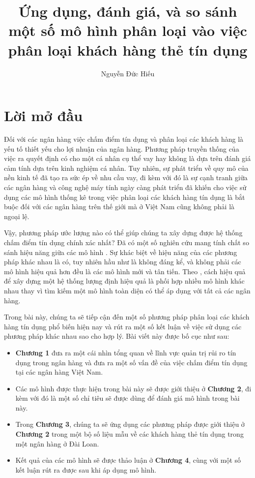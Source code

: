 \documentclass[a4paper]{report}\usepackage[]{graphicx}\usepackage[]{color}
\title{Ứng dụng, đánh giá, và so sánh một số mô hình phân loại vào việc phân loại khách hàng thẻ tín dụng}\let\Title\@title
\author{Nguyễn Đức Hiếu}\let\Author\@author
\begin{document}


\chapter*{Lời mở đầu}

%
Đối với các ngân hàng việc chấm điểm tín dụng và phân loại các khách hàng là yếu tố thiết yếu cho lợi nhuận của ngân hàng.
%
Phương pháp truyền thống của việc ra quyết định có cho một cá nhân cụ thể vay hay không là dựa trên đánh giá cảm tính dựa trên kinh nghiệm cá nhân.
%
Tuy nhiên, sự phát triển về quy mô của nền kinh tế đã tạo ra sức ép về nhu cầu vay, đi kèm với đó là sự cạnh tranh giữa các ngân hàng và công nghệ máy tính ngày càng phát triển đã khiến cho việc sử dụng các mô hình thống kê trong việc phân loại các khách hàng tín dụng là bắt buộc đối với các ngân hàng trên thế giới mà ở Việt Nam cũng không phải là ngoại lệ.
%

Vậy, phương pháp ước lượng nào có thể giúp chúng ta xây dựng được hệ thống chấm điểm tín dụng chính xác nhất? Đã có một số nghiên cứu mang tính chất so sánh hiệu năng giữa các mô hình \parencite{baesens2003benchmarking, xiao2006comparative, lessmann2015benchmarking}. 
Sự khác biệt về hiệu năng của các phương pháp khác nhau là có, tuy nhiên hầu như là không đáng kể, và không phải các mô hình hiệu quả hơn đều là các mô hình mới và tân tiến.
Theo \textcite{thomas2010consumer}, cách hiệu quả để xây dựng một hệ thống lượng định hiệu quả là phối hợp nhiều mô hình khác nhau thay vì tìm kiếm một mô hình toàn diện có thể áp dụng với tất cả các ngân hàng.

Trong bài này, chúng ta sẽ tiếp cận đến một số phương pháp phân loại các khách hàng tín dụng phổ biến hiện nay và rút ra một số kết luận về việc sử dụng các phương pháp khác nhau sao cho hợp lý. Bài viết này được bố cục như sau:

\begin{itemize}
\item \textbf{Chương 1} đưa ra một cái nhìn tổng quan về lĩnh vực quản trị rủi ro tín dụng trong ngân hàng và đưa ra một số vấn đề của việc chấm điểm tín dụng tại các ngân hàng Việt Nam.
\item Các mô hình được thực hiện trong bài này sẽ được giới thiệu ở \textbf{Chương 2}, đi kèm với đó là một số chỉ tiêu sẽ được dùng để đánh giá mô hình trong bài này.
\item Trong \textbf{Chương 3}, chúng ta sẽ ứng dụng các phương pháp được giới thiệu ở \textbf{Chương 2} trong một bộ số liệu mẫu về các khách hàng thẻ tín dụng trong một ngân hàng ở Đài Loan.
\item Kết quả của các mô hình sẽ được thảo luận ở \textbf{Chương 4}, cùng với một số kết luận rút ra được sau khi áp dụng mô hình.
\end{itemize}
\end{document}
